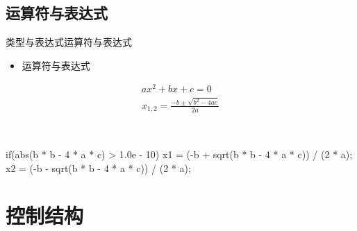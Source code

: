 \subsection[运算符与表达式]{运算符与表达式}
\begin{frame}[fragile]{类型与表达式}{运算符与表达式}
  \begin{spacing}{1.3}
  \begin{itemize}
  \item 运算符与表达式
  \end{itemize}
  \centering  
  \begin{minipage}{0.3\linewidth}
    \scriptsize
    \begin{gather*}
      ax^{2}+bx+c=0 \\
      x_{1,2}=\frac{-b \pm \sqrt{b^{2}-4ac}}{2a}
    \end{gather*}
  \end{minipage}\\
  \begin{minipage}{0.6\linewidth}
    \begin{cppcode}
if(abs(b * b - 4 * a * c) > 1.0e - 10)
{
    x1 = (-b + sqrt(b * b - 4 * a * c)) / (2 * a);
    x2 = (-b - sqrt(b * b - 4 * a * c)) / (2 * a);
}
    \end{cppcode}
  \end{minipage}
  
  \end{spacing}
\end{frame}

\section[控制结构]{控制结构}\label{sec:chap02-sec04}
